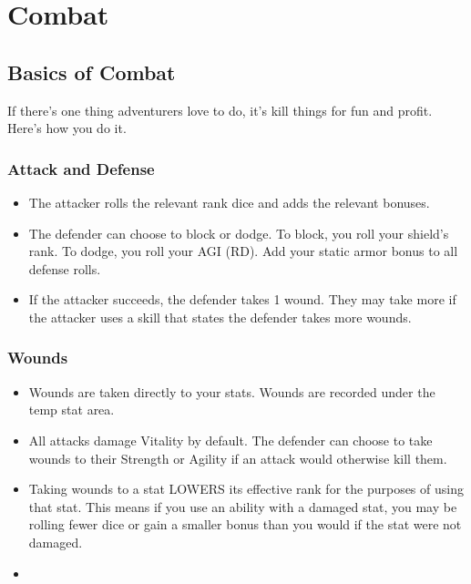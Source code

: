 \chapter{Combat}
\begin{multicols}{2}
\section{Basics of Combat}
If there's one thing adventurers love to do, it's kill things for fun and profit. Here's how you do it.
\subsection{Attack and Defense}
\begin{itemize}
\item The attacker rolls the relevant rank dice and adds the relevant bonuses.
\item The defender can choose to block or dodge. To block, you roll your shield's rank. To dodge, you roll your AGI (RD). Add your static armor bonus to all defense rolls.
\item If the attacker succeeds, the defender takes 1 wound. They may take more if the attacker uses a skill that states the defender takes more wounds.
\end{itemize}
\subsection{Wounds}
\begin{itemize}
\item Wounds are taken directly to your stats. Wounds are recorded under the temp stat area.\\
\item All attacks damage Vitality by default. The defender can choose to take wounds to their Strength or Agility if an attack would otherwise kill them.\\
\item Taking wounds to a stat LOWERS its effective rank for the purposes of using that stat. This means if you use an ability with a damaged stat, you may be rolling fewer dice or gain a smaller bonus than you would if the stat were not damaged.\\
\item {}
\end{itemize}


\end{multicols}
